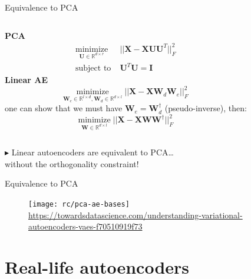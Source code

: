 \documentclass[handout]{beamer}
\begin{document}
  \begin{frame}{Equivalence to PCA}

    \begin{columns}[T,onlytextwidth]
      \centering \textbf{PCA}
      \begin{align*}
        \underset{\mathbf{U} \in \mathbb{R}^{d \times r}}{\text{minimize}} &\; ||\mathbf{X} - \mathbf{X} \mathbf{U} \mathbf{U}^T||_F^2 \\
        \text{subject to} &\; \mathbf{U}^T \mathbf{U} = \mathbf{I}
      \end{align*}
      \pause
      \centering \textbf{Linear AE}
      \begin{equation*}
        \underset{\mathbf{W}_e \in \mathbb{R}^{l \times d}, \mathbf{W}_d \in \mathbb{R}^{d \times l}}{\text{minimize}} \; ||\mathbf{X} - \mathbf{X} \mathbf{W}_d \mathbf{W}_e||_F^2
      \end{equation*}
      {\scriptsize one can show that we must have $\mathbf{W}_e = \mathbf{W}_d^{\dagger}$ (pseudo-inverse), then:}
      \begin{equation*}
        \underset{\mathbf{W} \in \mathbb{R}^{d \times l}}{\text{minimize}} \; ||\mathbf{X} - \mathbf{X} \mathbf{W} \mathbf{W}^{\dagger}||_F^2
      \end{equation*}

    \end{columns}

    \vspace{1cm}
    \pause
    \centering
    $\blacktriangleright$ Linear autoencoders are equivalent to PCA\dots\\
    \alert{without the orthogonality constraint}! \cite{Plaut2018}
    
  \end{frame}

  \begin{frame}{Equivalence to PCA}

    \begin{figure}
      \texttt{[image: rc/pca-ae-bases]}\\
      \tiny{\url{https://towardsdatascience.com/understanding-variational-autoencoders-vaes-f70510919f73}}
    \end{figure}
    
  \end{frame}

  \section{Real-life autoencoders}
\end{document}
